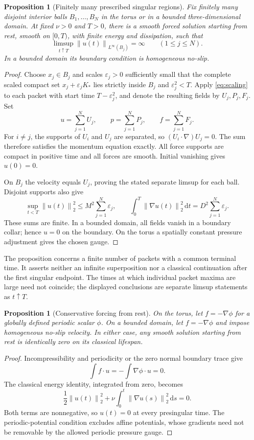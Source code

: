 \documentclass[11pt,a4paper]{article}
\newtheorem{proposition}[theorem]{Proposition}
\theoremstyle{definition}\newtheorem{definition}[theorem]{Definition}
\theoremstyle{remark}\newtheorem{remark}[theorem]{Remark}
\newcommand{\dd}{\,\mathrm d}\newcommand{\eps}{\varepsilon}
\newcommand{\norm}[1]{\left\lVert#1\right\rVert}
\begin{document}
\begin{proposition}[Finitely many prescribed singular regions]\label{prop:multiple}
Fix finitely many disjoint interior balls $B_1,\ldots,B_N$ in the torus or in a bounded three-dimensional domain. At fixed $\nu>0$ and $T>0$, there is a smooth forced solution starting from rest, smooth on $[0,T)$, with finite energy and dissipation, such that
\[
 \limsup_{t\uparrow T}\norm{u(t)}_{L^\infty(B_j)}=\infty
 \qquad(1\le j\le N).
\]
In a bounded domain its boundary condition is homogeneous no-slip.
\end{proposition}
\begin{proof}
Choose $x_j\in B_j$ and scales $\eps_j>0$ sufficiently small that the complete scaled compact set $x_j+\eps_jK_*$ lies strictly inside $B_j$ and $\eps_j^2<T$. Apply \eqref{eq:scaling} to each packet with start time $T-\eps_j^2$, and denote the resulting fields by $U_j,P_j,F_j$.
Set
\[
 u=\sum_{j=1}^N U_j,\qquad p=\sum_{j=1}^N P_j,\qquad f=\sum_{j=1}^N F_j.
\]
For $i\ne j$, the supports of $U_i$ and $U_j$ are separated, so
$(U_i\cdot\nabla)U_j=0$. The sum therefore satisfies the momentum equation exactly. All force supports are compact in positive time and all forces are smooth. Initial vanishing gives $u(0)=0$.

On $B_j$ the velocity equals $U_j$, proving the stated separate limsup for each ball. Disjoint supports also give
\[
 \sup_{t<T}\norm{u(t)}_2^2\le M^2\sum_{j=1}^N\eps_j,\qquad
 \int_0^T\norm{\nabla u(t)}_2^2\dd t=D^2\sum_{j=1}^N\eps_j.
\]
These sums are finite. In a bounded domain, all fields vanish in a boundary collar; hence $u=0$ on the boundary. On the torus a spatially constant pressure adjustment gives the chosen gauge.
\end{proof}
The proposition concerns a finite number of packets with a common terminal time. It asserts neither an infinite superposition nor a classical continuation after the first singular endpoint. The times at which individual packet maxima are large need not coincide; the displayed conclusions are separate limsup statements as $t\uparrow T$.

\begin{proposition}[Conservative forcing from rest]\label{prop:conservative}
On the torus, let $f=-\nabla\phi$ for a globally defined periodic scalar
$\phi$. On a bounded domain, let $f=-\nabla\phi$ and impose homogeneous no-slip velocity. In either case, any smooth solution starting from rest is identically zero on its classical lifespan.
\end{proposition}
\begin{proof}
Incompressibility and periodicity or the zero normal boundary trace give
\[
 \int f\cdot u
 =-\int\nabla\phi\cdot u=0.
\]
The classical energy identity, integrated from zero, becomes
\[
 \frac12\norm{u(t)}_2^2
 +\nu\int_0^t\norm{\nabla u(s)}_2^2\dd s=0.
\]
Both terms are nonnegative, so $u(t)=0$ at every presingular time.
The periodic-potential condition excludes affine potentials, whose gradients need not be removable by the allowed periodic pressure gauge.
\end{proof}
\end{document}

